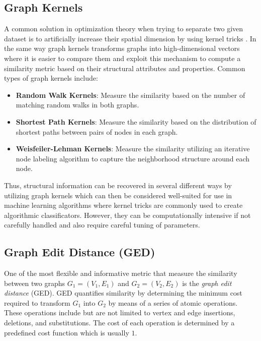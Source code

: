 \documentclass[../Thesis.tex]{subfiles}
\begin{document}
	
	
	\subsection{Graph Kernels}
	
	A common solution in optimization theory when trying to separate two given dataset is to artificially increase their spatial dimension by using kernel tricks \cite{kerneltrick}. In the same way graph kernels transforms graphs into high-dimensional vectors where it is easier to compare them and exploit this mechanism to compute a similarity metric based on their structural attributes and properties. Common types of graph kernels include:
	
	\begin{itemize}
		\item \textbf{Random Walk Kernels}: Measure the similarity based on the number of matching random walks in both graphs.
		\item \textbf{Shortest Path Kernels}: Measure the similarity based on the distribution of shortest paths between pairs of nodes in each graph.
		\item \textbf{Weisfeiler-Lehman Kernels}: Measure the similarity utilizing an iterative node labeling algorithm to capture the neighborhood structure around each node.
	\end{itemize}
	
	Thus, structural information can be recovered in several different ways by utilizing graph kernels which can then be considered well-suited for use in machine learning algorithms where kernel tricks are commonly used to create algorithmic classificators. However, they can be computationally intensive if not carefully handled and also require careful tuning of parameters.
	
	
	
	\subsection{Graph Edit Distance (GED)}
	
	One of the most flexible and informative metric that measure the similarity between two graphs $G_1 = (V_1, E_1)$ and $G_2 = (V_2, E_2)$ is the \emph{graph edit distance} (GED). GED quantifies similarity by determining the minimum cost required to transform $G_1$ into $G_2$ by means of a series of atomic operations. These operations include but are not limited to vertex and edge insertions, deletions, and substitutions. The cost of each operation is determined by a predefined cost function which is usually $1$.
	
\end{document}
